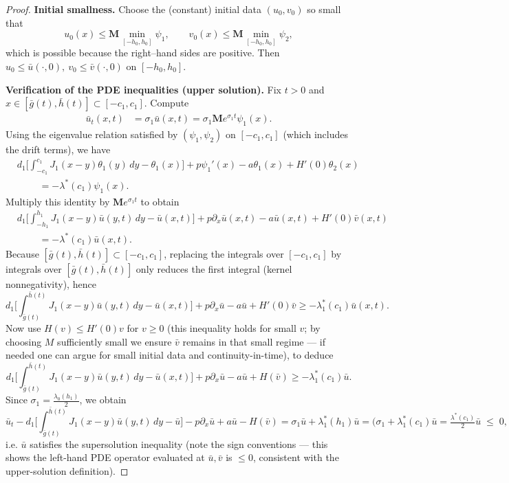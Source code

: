 \documentclass[a4paper,11pt]{amsart}
\theoremstyle{definition}
\numberwithin{equation}{section}
\theoremstyle{definition}
\begin{document}
\begin{proof}
\medskip\noindent\textbf{Initial smallness.}
Choose the (constant) initial data \((u_0,v_0)\) so small that
\[
u_0(x)\leq \mathbf{M}\min_{[-h_0,h_0]}\psi_1,\qquad v_0(x)\leq \mathbf{M}\min_{[-h_0,h_0]}\psi_2,
\]
which is possible because the right–hand sides are positive. Then \(u_0\leq\bar u(\cdot,0),\ v_0\leq\bar v(\cdot,0)\) on \([-h_0,h_0]\).

\medskip\noindent\textbf{Verification of the PDE inequalities (upper solution).}
Fix \(t>0\) and \(x\in[\bar g(t),\bar h(t)]\subset[-c_1,c_1]\). Compute
\[
\begin{aligned}
\bar u_t(x,t)
&= \sigma_1 \bar u(x,t)
= \sigma_1\mathbf{M}  e^{\sigma_1 t}\psi_1(x).
\end{aligned}
\]
Using the eigenvalue relation satisfied by \((\psi_1,\psi_2)\) on \([-c_1,c_1]\) (which includes the drift terms), we have
\[
\begin{aligned}
&d_1\Big[\int_{-c_1}^{c_1} J_1(x-y)\theta_1(y)\,dy - \theta_1(x)\Big] + p\psi_1'(x) - a \theta_1(x) + H'(0)\theta_2(x) \\
&\qquad\;= -\lambda^\ast(c_1)\psi_1(x).
\end{aligned}
\]
Multiply this identity by \(\mathbf{M} e^{\sigma_1 t}\) to obtain
\[
\begin{aligned}
&d_1\Big[\int_{-h_1}^{h_1} J_1(x-y)\bar u(y,t)\,dy - \bar u(x,t)\Big] + p\partial_x\bar u(x,t) - a\bar u(x,t) + H'(0)\bar v(x,t) \\
&\qquad\;= -\lambda^\ast(c_1)\bar u(x,t).
\end{aligned}
\]
Because \([\bar g(t),\bar h(t)]\subset[-c_1,c_1]\), replacing the integrals over \([-c_1,c_1]\) by integrals over \([\bar g(t),\bar h(t)]\) only reduces the first integral (kernel nonnegativity), hence
\[
d_1\Big[\int_{\bar g(t)}^{\bar h(t)} J_1(x-y)\bar u(y,t)\,dy - \bar u(x,t)\Big] + p\partial_x\bar u - a\bar u + H'(0)\bar v
\geq -\lambda^\ast_1(c_1)\bar u(x,t).
\]
Now use \(H(v)\leq H'(0)v\) for \(v\geq0\) (this inequality holds for small \(v\); by choosing \(M\) sufficiently small we ensure \(\bar v\) remains in that small regime — if needed one can argue for small initial data and continuity-in-time), to deduce
\[
d_1\Big[\int_{\bar g(t)}^{\bar h(t)} J_1(x-y)\bar u(y,t)\,dy - \bar u(x,t)\Big] + p\partial_x\bar u - a\bar u + H(\bar v)
\geq -\lambda^\ast_1(c_1)\bar u.
\]
Since \(\sigma_1=\frac{\lambda_0(h_1)}{2}\), we obtain
\[
\bar u_t - d_1\Big[\int_{\bar g(t)}^{\bar h(t)} J_1(x-y)\bar u(y,t)\,dy - \bar u\Big] - p\partial_x\bar u + a\bar u - H(\bar v)
= \sigma_1\bar u +\lambda^\ast_1(h_1)\bar u = (\sigma_1+\lambda^\ast_1(c_1)\bar u
= \tfrac{\lambda^\ast(c_1)}{2}\bar u \; \leq\; 0,
\]
i.e. \(\bar u\) satisfies the supersolution inequality (note the sign conventions — this shows the left-hand PDE operator evaluated at \(\bar u,\bar v\) is \(\leq 0\), consistent with the upper-solution definition).


\end{proof}
\end{document}
